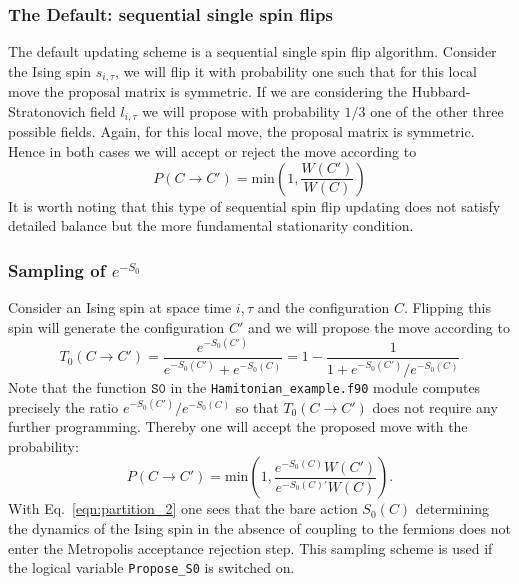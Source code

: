 \subsubsection{The Default: sequential  single spin flips}
%
The default updating scheme is a  sequential single  spin flip algorithm.   Consider   the Ising spin $s_{i,\tau}$, we will flip it with probability one such that for  this local move  the  proposal matrix is symmetric.  If we are considering the Hubbard-Stratonovich field $l_{i,\tau}$  we will propose with probability $1/3$ one  of the other three  possible fields.   Again, for this local move, the proposal matrix is symmetric.  Hence in both cases we will accept or reject the move according to 
 \begin{equation}
 	P(C \rightarrow C') =  \text{min}  \left( 1, \frac{ W(C')}{W(C)} \right)
 \end{equation}
 It is worth noting that this type of sequential spin flip updating does not satisfy detailed balance but the more fundamental stationarity condition. 
% 
\subsubsection{Sampling of $e^{-S_0}$}
% 
Consider an Ising spin at space time $i,\tau$ and the configuration $C$. Flipping this spin will generate the configuration $C'$ and we will propose the move according to 
  \begin{equation}
 T_0(C \rightarrow C')  =  \frac{e^{-S_0(C')}}{ e^{-S_0(C')} + e^{-S_0(C)} }   = 1 - \frac{1}{1 +  e^{-S_0(C')} /e^{-S_0(C)}}
  \end{equation}
 Note that the function $\texttt{S0}$ in the  \texttt{Hamitonian\_example.f90}  module  computes precisely the ratio $e^{-S_0(C')} /e^{-S_0(C)} $ so that  $T_0(C \rightarrow C') $ does not require any further programming. 
 Thereby one will accept  the proposed move with the probability: 
 \begin{equation}
 P(C \rightarrow C') =  \text{min}  \left( 1,  \frac{e^{-S_0(C)}   W(C')}{ e^{-S_0(C)'} W(C)} \right).
 \end{equation}
 With Eq.~\ref{eqn:partition_2}  one sees that the bare action $S_0(C)$  determining the  dynamics of the Ising spin  in the absence of coupling to the fermions  does not enter the Metropolis acceptance rejection step.  This sampling scheme is used  if the logical variable \texttt{Propose\_S0}   is switched on. 
% 
